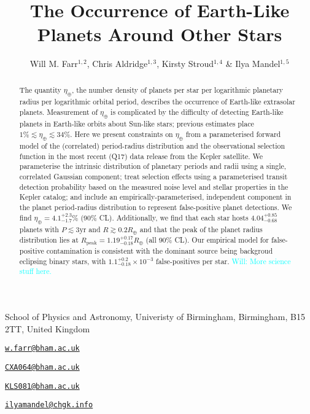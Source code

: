\documentclass{nature}
\newcommand{\etaearth}{\eta_\oplus}
\newcommand{\Rpeak}{R_\mathrm{peak}}
\newcommand{\REarth}{R_\oplus}
\newcommand{\email}[1]{\href{mailto:#1}{\nolinkurl{#1}}}
\newcommand{\Will}[1]{\textcolor{cyan}{Will: #1}}
\begin{document}
\title{The Occurrence of Earth-Like Planets Around Other Stars}

\author{Will M. Farr$^{1,2}$, Chris Aldridge$^{1,3}$, Kirsty Stroud$^{1,4}$ \& Ilya Mandel$^{1,5}$}

\maketitle

\begin{affiliations}
\item School of Physics and Astronomy, Univeristy of Birmingham, Birmingham, B15 2TT, United Kingdom
\item \email{w.farr@bham.ac.uk}
\item \email{CXA064@bham.ac.uk}
\item \email{KLS081@bham.ac.uk}
\item \email{ilyamandel@chgk.info}
\end{affiliations}

\begin{abstract}
  The quantity $\etaearth$, the number density of planets per star per
  logarithmic planetary radius per logarithmic orbital period,
  describes the occurrence of Earth-like extrasolar planets.
  Measurement of $\etaearth$ is complicated by the difficulty of
  detecting Earth-like planets in Earth-like orbits about Sun-like
  stars; previous
  estimates\cite{2011ApJ...738...81W,2011ApJ...738..151C,2012ApJ...745...20T,2013ApJ...778...53D,2013PNAS..11019273P}
  place $1\% \lesssim \etaearth \lesssim 34\%$.  Here we present
  constraints on $\etaearth$ from a parameterised forward model of the
  (correlated) period-radius distribution and the observational
  selection function in the most recent (Q17) data release from the
  Kepler
  satellite\cite{2010Sci...327..977B,2011ApJ...736...19B,2013ApJS..204...24B}.
  We parameterise the intrinsic distribution of planetary periods and
  radii using a single, correlated Gaussian component; treat selection
  effects using a parameterised transit detection probability based on
  the measured noise level and stellar properties in the Kepler
  catalog; and include an empirically-parameterised, independent
  component in the planet period-radius distribution to represent
  false-positive planet detections.  We find $\etaearth =
  4.1^{+2.3}_{-1.7}\%$ (90\% CL).  Additionally, we find that each
  star hosts $4.04_{-0.68}^{+0.85}$ planets with $P \lesssim 3
  \mathrm{yr}$ and $R \gtrsim 0.2 \REarth$ and that the peak of the
  planet radius distribution lies at $\Rpeak = 1.19_{-0.18}^{+0.17}
  \REarth$ (all 90\% CL).  Our empirical model for false-positive
  contamination is consistent with the dominant source being backgroud
  eclipsing binary stars, with $1.1_{-0.18}^{+0.2} \times 10^{-3}$
  false-positives per star.  \Will{More science stuff here.}
\end{abstract}
\end{document}
